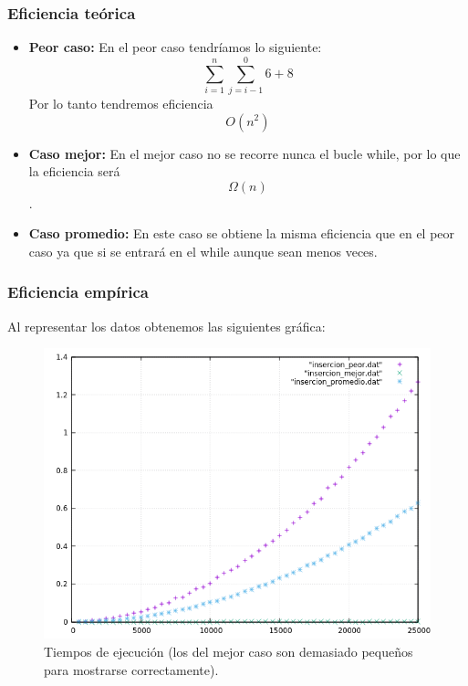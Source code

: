 \subsubsection{Eficiencia teórica}

\begin{itemize}
  \item \textbf{Peor caso:} En el peor caso tendríamos lo siguiente:
  \begin{equation}
      \sum_{i=1}^{n} \sum_{j=i-1}^{0} 6 + 8 
  \end{equation}
  Por lo tanto tendremos eficiencia \begin{equation} O(n^2) \end{equation}
  
  \item \textbf{Caso mejor:} En el mejor caso no se recorre nunca el bucle while, por lo que la eficiencia será \begin{equation} \Omega(n) \end{equation} .
  \item \textbf{Caso promedio:} En este caso se obtiene la misma eficiencia que en el peor caso ya que si se entrará en el while aunque sean menos veces.
\end{itemize}

\subsubsection{Eficiencia empírica}

Al representar los datos obtenemos las siguientes gráfica:

\begin{figure}[H]
    \begin{center}
        \includegraphics[scale=0.7]{imagenes/g_i.png}
        \caption{Tiempos de ejecución (los del mejor caso son demasiado pequeños para mostrarse correctamente).}
        \label{fig5}
    \end{center}
\end{figure}

